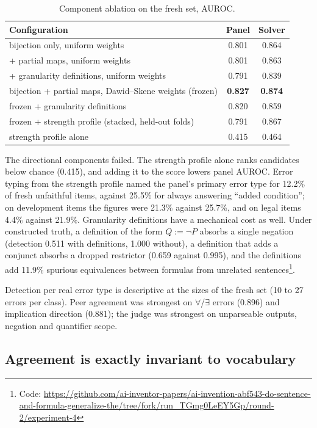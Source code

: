 \documentclass[11pt,letterpaper]{article}
\newcommand{\fe}{$\forall$/$\exists$}
\begin{document}
\begin{table}[!htbp]
  \centering
  \small
  \caption{Component ablation on the fresh set, AUROC.}
  \label{tab:ablation}
  \begin{tabular}{lcc}
    \toprule
    Configuration & Panel & Solver \\
    \midrule
    bijection only, uniform weights & 0.801 & 0.864 \\
    \quad + partial maps, uniform weights & 0.801 & 0.863 \\
    \quad + granularity definitions, uniform weights & 0.791 & 0.839 \\
    bijection + partial maps, Dawid--Skene weights (frozen) & \textbf{0.827} & \textbf{0.874} \\
    frozen + granularity definitions & 0.820 & 0.859 \\
    frozen + strength profile (stacked, held-out folds) & 0.791 & 0.867 \\
    strength profile alone & 0.415 & 0.464 \\
    \bottomrule
  \end{tabular}
\end{table}

The directional components failed. The strength profile alone ranks candidates below chance (0.415), and adding it to the score lowers panel AUROC. Error typing from the strength profile named the panel's primary error type for 12.2\% of fresh unfaithful items, against 25.5\% for always answering ``added condition''; on development items the figures were 21.3\% against 25.7\%, and on legal items 4.4\% against 21.9\%. Granularity definitions have a mechanical cost as well. Under constructed truth, a definition of the form $Q := \neg P$ absorbs a single negation (detection 0.511 with definitions, 1.000 without), a definition that adds a conjunct absorbs a dropped restrictor (0.659 against 0.995), and the definitions add 11.9\% spurious equivalences between formulas from unrelated sentences\footnote{Code: \url{https://github.com/ai-inventor-papers/ai-invention-abf543-do-sentence-and-formula-generalize-the/tree/fork/run_TGmg0LeEY5Gp/round-2/experiment-4}}.

Detection per real error type is descriptive at the sizes of the fresh set (10 to 27 errors per class). Peer agreement was strongest on \fe{} errors (0.896) and implication direction (0.881); the judge was strongest on unparseable outputs, negation and quantifier scope.

\subsection{Agreement is exactly invariant to vocabulary}
\label{sec:invariance}
\end{document}
